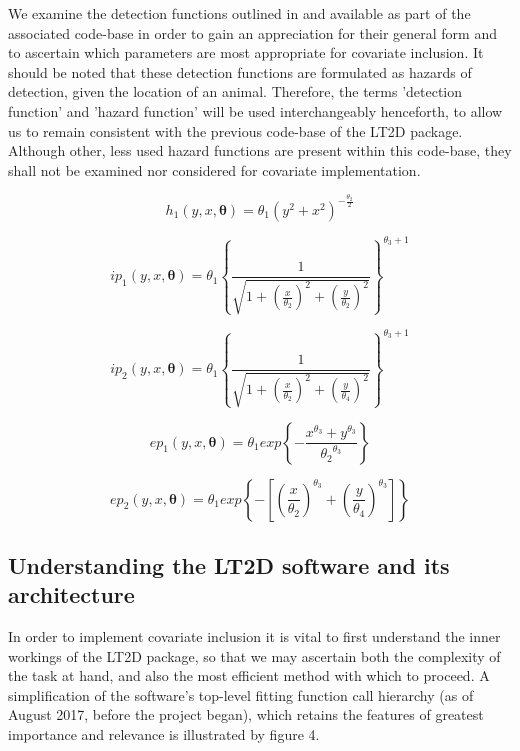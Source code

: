 \documentclass[11pt]{article}
\begin{document}
\begin{multicols}{2}
We examine the detection functions outlined in \cite{Borchers} and available as part of the associated code-base in order to gain an appreciation for their general form and to ascertain which parameters are most appropriate for covariate inclusion. It should be noted that these detection functions are formulated as hazards of detection, given the location of an animal. Therefore, the terms 'detection function' and 'hazard function' will be used interchangeably henceforth, to allow us to remain consistent with the previous code-base of the LT2D package. Although other, less used hazard functions are present within this code-base, they shall not be examined nor considered for covariate implementation.

\begingroup
\large

\begin{equation}
h_1\left(y,x,\boldsymbol{\theta}\right) = \theta_1\left(y^2+x^2\right)^{-\frac{\theta_2}{2}}
\end{equation}

\begin{equation}
ip_1\left(y,x,\boldsymbol{\theta}\right) = \theta_1\left\{\frac{1}{\sqrt{1+\left(\frac{x}{\theta_2}\right)^2+\left(\frac{y}{\theta_2}\right)^2}}\right\}^{\theta_3 + 1}
\end{equation}

\begin{equation}
ip_2\left(y,x,\boldsymbol{\theta}\right) = \theta_1\left\{\frac{1}{\sqrt{1+\left(\frac{x}{\theta_2}\right)^2+\left(\frac{y}{\theta_4}\right)^2}}\right\}^{\theta_3 + 1}
\end{equation}


\begin{equation}
ep_1\left(y,x,\boldsymbol{\theta}\right) = \theta_1exp\left\{-\frac{x^{\theta_3}+y^{\theta_3}}{{\theta_2}^{\theta_3}}\right\}
\end{equation}

\begin{equation}
ep_2\left(y,x,\boldsymbol{\theta}\right) = \theta_1exp\left\{-\left[\left(\frac{x}{\theta_2}\right)^{\theta_3}+\left(\frac{y}{\theta_4}\right)^{\theta_3}\right]\right\}
\end{equation}
\endgroup


\subsection{Understanding the LT2D software and its architecture}
In order to implement covariate inclusion it is vital to first understand the inner workings of the LT2D package, so that we may ascertain both the complexity of the task at hand, and also the most efficient method with which to proceed. A simplification of the software's top-level fitting function call hierarchy (as of August 2017, before the project began), which retains the features of greatest importance and relevance is illustrated by figure 4.


\end{multicols}
\end{document}
